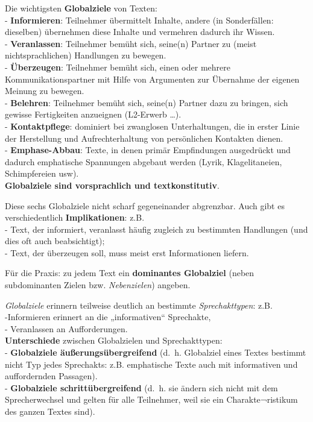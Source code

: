 \documentclass[
  letterpaper,
]{scrbook}
\begin{document}
Die wichtigsten \textbf{Globalziele} von Texten:\\
- \textbf{Informieren}: Teilnehmer übermittelt Inhalte, andere (in
Sonderfällen: dieselben) übernehmen diese Inhalte und vermehren dadurch
ihr Wissen.\\
- \textbf{Veranlassen}: Teilnehmer bemüht sich, seine(n) Partner zu
(meist nichtsprachlichen) Handlungen zu bewegen.\\
- \textbf{Überzeugen}: Teilnehmer bemüht sich, einen oder mehrere
Kommunikationspartner mit Hilfe von Argumenten zur Übernahme der eigenen
Meinung zu bewegen.\\
- \textbf{Belehren}: Teilnehmer bemüht sich, seine(n) Partner dazu zu
bringen, sich gewisse Fertigkeiten anzueignen (L2-Erwerb \ldots).\\
- \textbf{Kontaktpflege}: dominiert bei zwanglosen Unterhaltungen, die
in erster Linie der Herstellung und Aufrechterhaltung von persönlichen
Kontakten dienen.\\
- \textbf{Emphase-Abbau}: Texte, in denen primär Empfindungen
ausgedrückt und dadurch emphatische Spannungen abgebaut werden (Lyrik,
Klagelitaneien, Schimpfereien usw).\\

\textbf{Globalziele sind vorsprachlich und textkonstitutiv}.

Diese sechs Globalziele nicht scharf gegeneinander abgrenzbar. Auch gibt
es verschiedentlich \textbf{Implikationen}: z.B.\\
- Text, der informiert, veranlasst häufig zugleich zu bestimmten
Handlungen (und dies oft auch beabsichtigt);\\
- Text, der überzeugen soll, muss meist erst Informationen liefern.

Für die Praxis: zu jedem Text ein \textbf{dominantes Globalziel} (neben
subdominanten Zielen bzw. \emph{Nebenzielen}) angeben.

\emph{Globalziele} erinnern teilweise deutlich an bestimmte
\emph{Sprechakttypen}: z.B.\\
-Informieren erinnert an die „informativen`` Sprechakte,\\
- Veranlassen an Aufforderungen.\\

\textbf{Unterschiede} zwischen Globalzielen und Sprechakttypen:\\
- \textbf{Globalziele äußerungsübergreifend} (d.~h. Globalziel eines
Textes bestimmt nicht Typ jedes Sprechakts: z.B. emphatische Texte auch
mit informativen und auffordernden Passagen).\\
- \textbf{Globalziele schrittübergreifend} (d.~h. sie ändern sich nicht
mit dem Sprecherwechsel und gelten für alle Teilnehmer, weil sie ein
Charakte¬ristikum des ganzen Textes sind).
\end{document}
